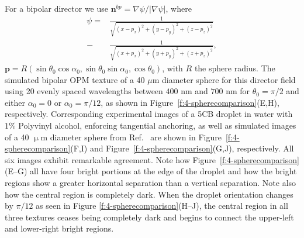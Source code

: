 For a bipolar director we use $\mathbf{n}^{bp} = \nabla \psi/|\nabla \psi|$, where
\begin{align}
\psi =& \frac{1}{\sqrt{(x-p_x)^2+(y-p_y)^2+(z-p_z)^2}} \nonumber \\
      -& \frac{1}{\sqrt{(x+p_x)^2+(y+p_y)^2+(z+p_z)^2}}, \label{e:4-bipolar_pot}
\end{align}
$\mathbf{p} = R(\sin \theta_0\cos\alpha_0,\sin \theta_0\sin\alpha_0,\cos\theta_0) $, with $R$ the sphere radius.
The simulated bipolar OPM texture of a 40 $\mu$m diameter sphere for this director field using 20 evenly spaced wavelengths between $400$ nm and $700$ nm for $\theta_0 = \pi/2$ and either $\alpha_0 = 0$ or $\alpha_0 = \pi/12$, as shown in Figure~\ref{f:4-spherecomparison}(E,H), respectively.
Corresponding experimental images of a 5CB droplet in water with $1\%$ Polyvinyl alcohol, enforcing tangential anchoring, as well as simulated images of a 40 $\upmu$m diameter sphere from Ref.~\cite{RN310} are shown in Figure~\ref{f:4-spherecomparison}(F,I) and Figure~\ref{f:4-spherecomparison}(G,J), respectively.
All six images exhibit remarkable agreement.
Note how Figure~\ref{f:4-spherecomparison}(E--G) all have four bright portions at the edge of the droplet and how the bright regions show a greater horizontal separation than a vertical separation.
Note also how the central region is completely dark.
When the droplet orientation changes by $\pi/12$ as seen in Figure \ref{f:4-spherecomparison}(H--J), the central region in all three textures ceases being completely dark and begins to connect the upper-left and lower-right bright regions.

